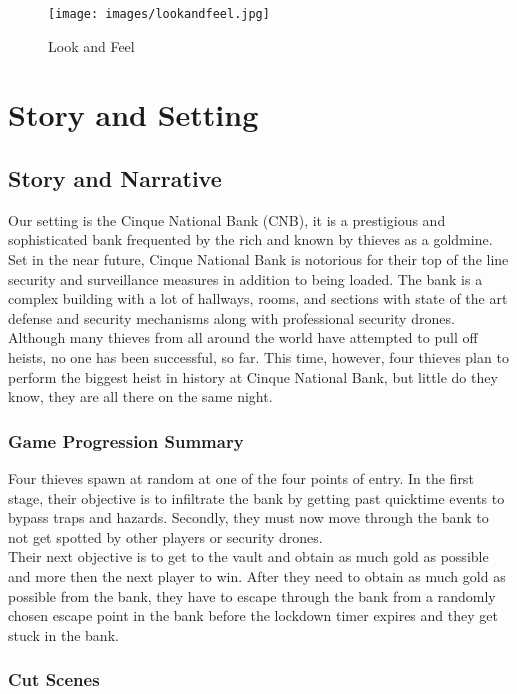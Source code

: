 \documentclass[10pt]{report}
\begin{document}
\begin{figure}[H]
	\texttt{[image: images/lookandfeel.jpg]}
	\caption{Look and Feel}
\end{figure}

\chapter{Story and Setting}

\section{Story and Narrative}

Our setting is the Cinque National Bank (CNB), it is a prestigious and sophisticated bank frequented by the rich and known by thieves as a goldmine. Set in the near future, Cinque National Bank is notorious for their top of the line security and surveillance measures in addition to being loaded.  The bank is a complex building with a lot of hallways, rooms, and sections with state of the art defense and security mechanisms along with professional security drones. Although many thieves from all around the world have attempted to pull off heists, no one has been successful, so far. This time, however, four thieves plan to perform the biggest heist in history at Cinque National Bank, but little do they know, they are all there on the same night.

\subsection{Game Progression Summary}

Four thieves spawn at random at one of the four points of entry. In the first stage, their objective is to infiltrate the bank by getting past quicktime events to bypass traps and hazards. Secondly, they must now move through the bank to not get spotted by other players or security drones.\\
Their next objective is to get to the vault and obtain as much gold as possible and more then the next player to win. After they need to obtain as much gold as possible from the bank, they have to escape through the bank from a randomly chosen escape point in the bank before the lockdown timer expires and they get stuck in the bank.

\subsection{Cut Scenes}
\end{document}
